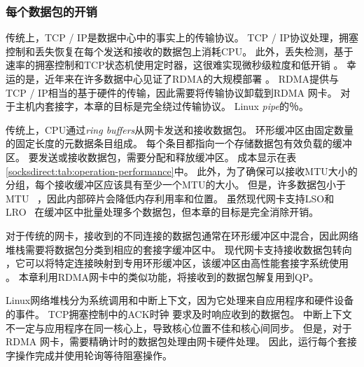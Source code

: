 \subsubsection{每个数据包的开销}
\label{socksdirect:subsec:per-packet-overhead}

传统上，TCP / IP是数据中心中的事实上的传输协议。
TCP / IP协议处理，拥塞控制和丢失恢复在每个发送和接收的数据包上消耗CPU。
此外，丢失检测，基于速率的拥塞控制和TCP状态机使用定时器，这很难实现微秒级粒度和低开销 \cite{jeong2014mtcp}。
幸运的是，近年来在许多数据中心见证了RDMA的大规模部署 \cite {guo2016rdma,zhu2015congestion,mittal2015timely}。
RDMA提供与TCP / IP相当的基于硬件的传输，因此需要将传输协议卸载到RDMA 网卡。
对于主机内套接字，本章的目标是完全绕过传输协议。 Linux \emph {pipe}的％。

传统上，CPU通过\emph {ring buffers}从网卡发送和接收数据包。
环形缓冲区由固定数量的固定长度的元数据条目组成。
每个条目都指向一个存储数据包有效负载的缓冲区。
要发送或接收数据包，需要分配和释放缓冲区。
成本显示在表 \ref {socksdirect:tab:operation-performance}中。
此外，为了确保可以接收MTU大小的分组，每个接收缓冲区应该具有至少一个MTU的大小。
但是，许多数据包小于MTU~ \cite {thompson1997wide}，因此内部碎片会降低内存利用率和位置。
虽然现代网卡支持LSO和LRO~ \cite {lsolro}在缓冲区中批量处理多个数据包，但本章的目标是完全消除开销。

对于传统的网卡，接收到的不同连接的数据包通常在环形缓冲区中混合，因此网络堆栈需要将数据包分类到相应的套接字缓冲区中。
现代网卡支持接收数据包转向 \cite {mellanox}，它可以将特定连接映射到专用环形缓冲区，该缓冲区由高性能套接字系统使用 \cite {jeong2014mtcp,lin2016scalable,libvma}。
本章利用RDMA网卡中的类似功能，将接收到的数据包解复用到QP。

Linux网络堆栈分为系统调用和中断上下文，因为它处理来自应用程序和硬件设备的事件。
TCP拥塞控制中的ACK时钟 \cite {mprdma}要求及时响应收到的数据包。
中断上下文不一定与应用程序在同一核心上，导致核心位置不佳和核心间同步。
但是，对于RDMA 网卡，需要精确计时的数据包处理由网卡硬件处理。
因此，\libipc {}运行每个套接字操作完成并使用轮询等待阻塞操作。

